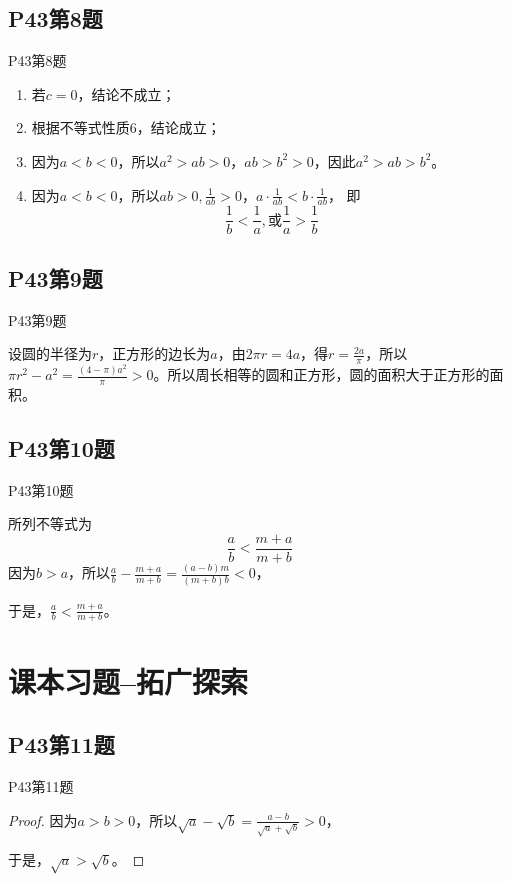 \documentclass[12pt,aspectratio=169,t,fleqn]{beamer}
\begin{document}
\subsection{P43第8题}
\begin{frame}{P43第8题}
\begin{solution}
	\begin{enumerate}[(\Alph*)]
		\item 若$c=0$，结论不成立；
		\item 根据不等式性质6，结论成立；
		\item 因为$a<b<0$，所以$a^2 > ab>0$，$ab>b^2>0$，因此$a^2>ab>b^2$。
		\item 因为$a<b<0$，所以$ab>0,\frac{1}{ab}>0$，$a\cdot\frac{1}{ab}<b\cdot\frac{1}{ab}$，
		即\[
		\frac{1}{b} < \frac{1}{a},\text{或} \frac{1}{a} > \frac{1}{b}
		\]
	\end{enumerate}
\end{solution}
\end{frame}

\subsection{P43第9题}
\begin{frame}{P43第9题}
	\begin{solution}
		设圆的半径为$r$，正方形的边长为$a$，由$2\pi r = 4a$，得$r=\frac{2a}{\pi}$，所以$\pi r^2 -a^2 = \frac{(4-\pi)a^2}{\pi}>0$。所以周长相等的圆和正方形，圆的面积大于正方形的面积。
	\end{solution}
\end{frame}

\subsection{P43第10题}
\begin{frame}{P43第10题}
	\begin{solution}
	\upshape	所列不等式为\[
		\frac{a}{b}<\frac{m+a}{m+b}
		\]
		因为$b>a$，所以$\frac{a}{b} - \frac{m+a}{m+b} = \frac{(a-b)m}{(m+b)b} < 0$，
		
		于是，$\frac{a}{b} < \frac{m+a}{m+b}$。
	\end{solution}
\end{frame}

\section{课本习题--拓广探索}

\subsection{P43第11题}
\begin{frame}{P43第11题}
	\begin{proof}
		因为$a>b>0$，所以$\sqrt{a} - \sqrt{b} = \frac{a-b}{\sqrt{a} + \sqrt{b}} >0$，
		
		于是，$\sqrt{a} > \sqrt{b}$。
	\end{proof}
\end{frame}
\end{document}
